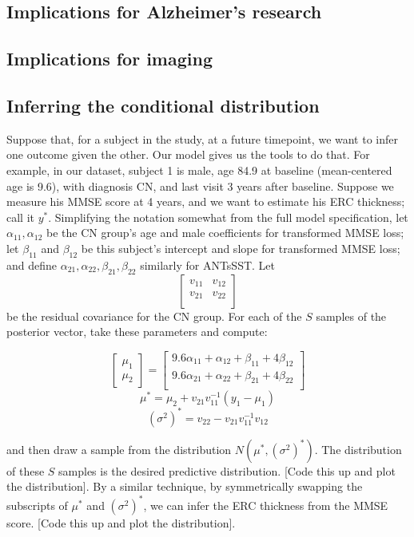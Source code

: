 \documentclass[12pt]{article}
\begin{document}
\subsection{Implications for Alzheimer's research}

\subsection{Implications for imaging}

\subsection{Inferring the conditional distribution}

Suppose that, for a subject in the study, at a future timepoint, we want to infer one outcome given the other. Our model gives us the tools to do that. For example, in our dataset, subject 1 is male, age 84.9 at baseline (mean-centered age is 9.6), with diagnosis CN, and last visit 3 years after baseline. Suppose we measure his MMSE score at 4 years, and we want to estimate his ERC thickness; call it $y^*$. Simplifying the notation somewhat from the full model specification, let $\alpha_{11}, \alpha_{12}$ be the CN group's age and male coefficients for transformed MMSE loss; let $\beta_{11}$ and $\beta_{12}$ be this subject's intercept and slope for transformed MMSE loss; and define $\alpha_{21}, \alpha_{22}, \beta_{21}, \beta_{22}$ similarly for ANTsSST. Let $$\begin{bmatrix} v_{11} & v_{12} \\ v_{21} & v_{22} \\ \end{bmatrix}$$ be the residual covariance for the CN group. For each of the $S$ samples of the posterior vector, take these parameters and compute:

$$\begin{bmatrix} \mu_1 \\ \mu_2 \end{bmatrix}
= \begin{bmatrix}
9.6 \alpha_{11} + \alpha_{12} + \beta_{11} + 4 \beta_{12} \\
9.6 \alpha_{21} + \alpha_{22} + \beta_{21} + 4 \beta_{22} \\
\end{bmatrix}$$
$$\mu^{*} = \mu_2 + v_{21} v_{11}^{-1} (y_1 - \mu_1)$$
$$(\sigma^2)^{*} = v_{22} - v_{21} v_{11}^{-1} v_{12}$$

and then draw a sample from the distribution $N(\mu^*, (\sigma^2)^*)$. The distribution of these $S$ samples is the desired predictive distribution. {\color{teal} [Code this up and plot the distribution].} By a similar technique, by symmetrically swapping the subscripts of $\mu^*$ and $(\sigma^2)^*$, we can infer the ERC thickness from the MMSE score. {\color{teal} [Code this up and plot the distribution].}
\end{document}
